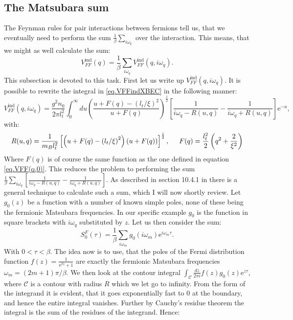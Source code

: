 \subsection{The Matsubara sum}
The Feynman rules for pair interactions between fermions tell us, that we eventually need to perform the sum $\frac{1}{\beta}\sum_{i\omega_q}$ over the interaction. This means, that we might as well calculate the sum:
\begin{equation}
V^\text{ind}_{FF}(q) = \frac{1}{\beta}\sum_{i\omega_q} V^\text{ind}_{FF}(q,i\omega_q).
\label{eq.VFFqdef}
\end{equation}  
This subsection is devoted to this task. First let us write up $V^\text{ind}_{FF}(q,i\omega_q)$. It is possible to rewrite the integral in \eqref{eq.VFFindXBEC} in the following manner:
\begin{equation}
V^\text{ind}_{FF}(q,i\omega_q) = \frac{g^2n_0}{2\pi l_t^2}\int_0^\infty du \left(\frac{u+F(q)-\left(l_t/\xi\right)^2}{u+F(q)}\right)^{\frac{1}{2}}\left[\frac{1}{i\omega_q-R(u,q)}-\frac{1}{i\omega_q+R(u,q)}\right]\text{e}^{-u},
\label{eq.VFFindomega}
\end{equation}
with: 
\begin{equation}
R(u,q) = \frac{1}{m_B l_t^2}\left[\left(u+F(q)-\left(l_t/\xi\right)^2\right)\left(u+F(q)\right)\right]^{\frac{1}{2}}, \hspace{0.5cm} F(q) = \frac{l_t^2}{2}\left(q^2+\frac{2}{\xi^2} \right)
\label{eq.Ruq}
\end{equation}
Where $F(q)$ is of course the same function as the one defined in equation \eqref{eq.VFF(q,0)}. This reduces the problem to performing the sum $\frac{1}{\beta}\sum_{i\omega_q}\left[\frac{1}{i\omega_q-R(u,q)}-\frac{1}{i\omega_q+R(u,q)}\right]$. As described in section 10.4.1 in \cite{BruusFlensberg} there is a general technique to calculate such a sum, which I will now shortly review. Let $g_0(z)$ be a function with a number of known simple poles, none of these being the fermionic Matsubara frequencies. In our specific example $g_0$ is the function in square brackets with $i\omega_q$ substituted by $z$. Let us then consider the sum:
\begin{equation}
S^F_0(\tau) = \frac{1}{\beta}\sum_{i\omega_m}g_0(i\omega_m)\text{e}^{i\omega_m\tau}. \nonumber
\end{equation}
With $0<\tau<\beta$. The idea now is to use, that the poles of the Fermi distribution function $f(z) = \frac{1}{\text{e}^{\beta z}+1}$ are exactly the fermionic Matsubara frequencies $\omega_m = (2m+1)\pi /\beta$. We then look at the contour integral $ \int_\mathcal{C} \frac{dz}{2\pi i} f(z)g_0(z)\text{e}^{z\tau}$, where $\mathcal{C}$ is a contour with radius $R$ which we let go to infinity. From the form of the integrand it is evident, that it goes exponentially fast to 0 at the boundary, and hence the entire integral vanishes. Further by Cauchy's residue theorem the integral is the sum of the residues of the integrand. Hence:
